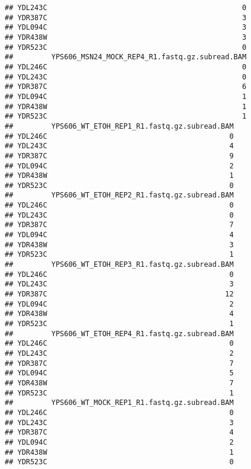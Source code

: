 \documentclass[
]{book}
\begin{document}
\begin{verbatim}
## YDL243C                                              0
## YDR387C                                              3
## YDL094C                                              3
## YDR438W                                              3
## YDR523C                                              0
##         YPS606_MSN24_MOCK_REP4_R1.fastq.gz.subread.BAM
## YDL246C                                              0
## YDL243C                                              0
## YDR387C                                              6
## YDL094C                                              1
## YDR438W                                              1
## YDR523C                                              1
##         YPS606_WT_ETOH_REP1_R1.fastq.gz.subread.BAM
## YDL246C                                           0
## YDL243C                                           4
## YDR387C                                           9
## YDL094C                                           2
## YDR438W                                           1
## YDR523C                                           0
##         YPS606_WT_ETOH_REP2_R1.fastq.gz.subread.BAM
## YDL246C                                           0
## YDL243C                                           0
## YDR387C                                           7
## YDL094C                                           4
## YDR438W                                           3
## YDR523C                                           1
##         YPS606_WT_ETOH_REP3_R1.fastq.gz.subread.BAM
## YDL246C                                           0
## YDL243C                                           3
## YDR387C                                          12
## YDL094C                                           2
## YDR438W                                           4
## YDR523C                                           1
##         YPS606_WT_ETOH_REP4_R1.fastq.gz.subread.BAM
## YDL246C                                           0
## YDL243C                                           2
## YDR387C                                           7
## YDL094C                                           5
## YDR438W                                           7
## YDR523C                                           1
##         YPS606_WT_MOCK_REP1_R1.fastq.gz.subread.BAM
## YDL246C                                           0
## YDL243C                                           3
## YDR387C                                           4
## YDL094C                                           2
## YDR438W                                           1
## YDR523C                                           0

\end{verbatim}
\end{document}
